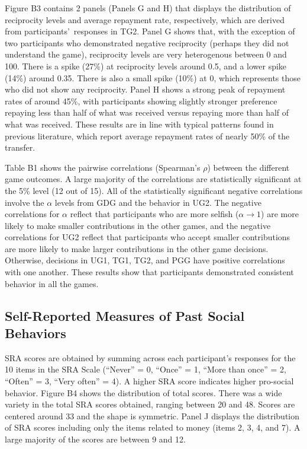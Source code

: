 \documentclass[12pt]{article}
\begin{document}
Figure B3 contains 2 panels (Panels G and H) that displays the distribution of reciprocity levels and average repayment rate, respectively, which are derived from participants\rq \ responses in TG2. Panel G shows that, with the exception of two participants who demonstrated negative reciprocity (perhaps they did not understand the game), reciprocity levels are very heterogenous between 0 and 100. There is a spike (27\%) at reciprocity levels around 0.5, and a lower spike (14\%) around 0.35. There is also a small spike (10\%) at 0, which represents those who did not show any reciprocity. Panel H shows a strong peak of repayment rates of around 45\%, with participants showing slightly stronger preference repaying less than half of what was received versus repaying more than half of what was received. These results are in line with typical patterns found in previous literature, which report average repayment rates of nearly 50\% of the transfer.

Table B1 shows the pairwise correlations (Spearman\rq s \(\rho\)) between the different game outcomes. A large majority of the correlations are statistically significant at the 5\% level (12 out of 15). All of the statistically significant negative correlations involve the \(\alpha\) levels from GDG and the behavior in UG2. The negative correlations for \(\alpha\) reflect that participants who are more selfish (\(\alpha \rightarrow 1\)) are more likely to make smaller contributions in the other games, and the negative correlations for UG2 reflect that participants who accept smaller contributions are more likely to make larger contributions in the other game decisions. Otherwise, decisions in UG1, TG1, TG2, and PGG have positive correlations with one another.
These results show that participants demonstrated consistent behavior in all the games.

\subsection{Self-Reported Measures of Past Social Behaviors}

SRA scores are obtained by summing across each participant\rq s responses for the 10 items in the SRA Scale (``Never'' = 0, ``Once'' = 1, ``More than once'' = 2, ``Often'' = 3, ``Very often'' = 4). A higher SRA score indicates higher pro-social behavior. Figure B4 shows the distribution of total scores. There was a wide variety in the total SRA scores obtained, ranging between 20 and 48. Scores are centered around 33 and the shape is symmetric. Panel J displays the distribution of SRA scores including only the items related to money (items 2, 3, 4, and 7). A large majority of the scores are between 9 and 12.
\end{document}
